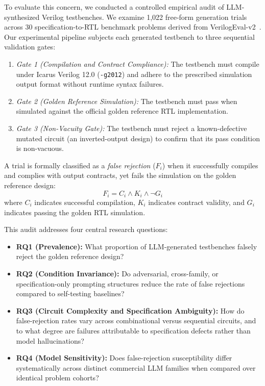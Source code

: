 \documentclass[conference]{IEEEtran}
\begin{document}
To evaluate this concern, we conducted a controlled empirical audit of LLM-synthesized Verilog testbenches. We examine 1,022 free-form generation trials across 30 specification-to-RTL benchmark problems derived from VerilogEval-v2~\cite{liu2023verilogeval,pinckney2024revisiting}. Our experimental pipeline subjects each generated testbench to three sequential validation gates:
\begin{enumerate}
    \item \textit{Gate 1 (Compilation and Contract Compliance):} The testbench must compile under Icarus Verilog 12.0 (\texttt{-g2012}) and adhere to the prescribed simulation output format without runtime syntax failures.
    \item \textit{Gate 2 (Golden Reference Simulation):} The testbench must pass when simulated against the official golden reference RTL implementation.
    \item \textit{Gate 3 (Non-Vacuity Gate):} The testbench must reject a known-defective mutated circuit (an inverted-output design) to confirm that its pass condition is non-vacuous.
\end{enumerate}

A trial is formally classified as a \textit{false rejection} ($F_i$) when it successfully compiles and complies with output contracts, yet fails the simulation on the golden reference design:
\begin{equation}
F_i = C_i \land K_i \land \neg G_i
\label{eq:fr_def}
\end{equation}
where $C_i$ indicates successful compilation, $K_i$ indicates contract validity, and $G_i$ indicates passing the golden RTL simulation.

This audit addresses four central research questions:
\begin{itemize}
    \item \textbf{RQ1 (Prevalence):} What proportion of LLM-generated testbenches falsely reject the golden reference design?
    \item \textbf{RQ2 (Condition Invariance):} Do adversarial, cross-family, or specification-only prompting structures reduce the rate of false rejections compared to self-testing baselines?
    \item \textbf{RQ3 (Circuit Complexity and Specification Ambiguity):} How do false-rejection rates vary across combinational versus sequential circuits, and to what degree are failures attributable to specification defects rather than model hallucinations?
    \item \textbf{RQ4 (Model Sensitivity):} Does false-rejection susceptibility differ systematically across distinct commercial LLM families when compared over identical problem cohorts?
\end{itemize}
\end{document}
